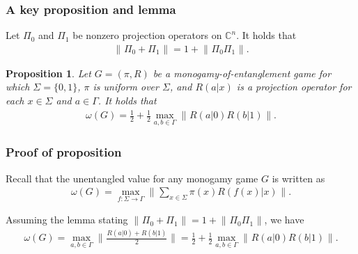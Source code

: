 \documentclass{beamer}
\newcommand{\tinyspace}{\mspace{1mu}}
\newcommand{\norm}[1]{\lVert\tinyspace #1 \tinyspace\rVert}
\newcommand{\biggnorm}[1]{\biggl\lVert\tinyspace #1 \tinyspace\biggr\rVert}
\def\complex{\mathbb{C}}
\newtheorem{prop}[theorem]{Proposition}
\begin{document}
\begin{frame}
	\frametitle{A key proposition and lemma}
	\begin{lemma}
		Let $\Pi_0$ and $\Pi_1$ be nonzero projection operators on $\complex^n$. It holds that 
		\begin{align*}
			\norm{\Pi_0 + \Pi_1} = 1 + \norm{\Pi_0 \Pi_1}.
		\end{align*}
	\end{lemma}
	\vspace{2mm}
	\begin{prop}
		Let $G = (\pi,R)$ be a monogamy-of-entanglement game for which $\Sigma = \{0,1\}$, $\pi$ is uniform over $\Sigma$, and $R(a|x)$ is a projection operator for each $x \in \Sigma$ and $a \in \Gamma$. It holds that 
		\begin{align*}
			\omega(G) = \frac{1}{2} + \frac{1}{2} \max_{a,b \in \Gamma} \biggnorm{R(a|0)R(b|1)}.
		\end{align*}
	\end{prop}
\end{frame}

\begin{frame} 
	\frametitle{Proof of proposition}
	Recall that the unentangled value for any monogamy game $G$ is written as 
	\begin{align*}
		\omega(G) = \max_{f : \Sigma \rightarrow \Gamma} \biggnorm{ \sum_{x \in \Sigma} \pi(x) R(f(x)|x) }.
	\end{align*}			
	\vspace{2mm}
	
	Assuming the lemma stating $\norm{\Pi_0 + \Pi_1} = 1 + \norm{\Pi_0 \Pi_1}$, we have 
	\begin{align*}
		\omega(G) = \max_{a,b \in \Gamma} \biggnorm{ \frac{R(a|0) + R(b|1)}{2} } = \frac{1}{2} + \frac{1}{2} \max_{a,b \in \Gamma} \biggnorm{R(a|0) R(b|1)}.
	\end{align*}
\end{frame}
\end{document}
